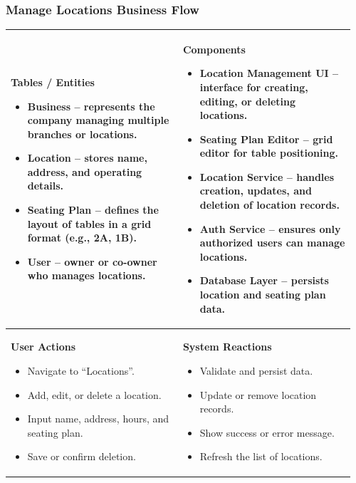 \documentclass[]{VUMIFTemplateClass}
\newenvironment{mpitemlist}[1][\linewidth]{%
    \begin{minipage}[t]{#1}%
        \setlength{\leftmargini}{12pt}%
        \begin{itemize}%
            \setlength{\itemsep}{1pt}%
            \setlength{\parskip}{0pt}%
            \setlength{\parsep}{0pt}%
}{%
        \end{itemize}%
    \end{minipage}\newline
}
\begin{document}
\subsubsection{Manage Locations Business Flow}
\begin{center}
\setlength{\tabcolsep}{8pt}
\renewcommand{\arraystretch}{1.3}
\begin{tabular}{|p{0.48\linewidth}|p{0.48\linewidth}|}
\hline
\textbf{Tables / Entities} \newline
\begin{mpitemlist}
\item \textbf{Business} – represents the company managing multiple branches or locations.
\item \textbf{Location} – stores name, address, and operating details.
\item \textbf{Seating Plan} – defines the layout of tables in a grid format (e.g., 2A, 1B).
\item \textbf{User} – owner or co-owner who manages locations.
\end{mpitemlist}
&
\textbf{Components} \newline
\begin{mpitemlist}
\item \textbf{Location Management UI} – interface for creating, editing, or deleting locations.
\item \textbf{Seating Plan Editor} – grid editor for table positioning.
\item \textbf{Location Service} – handles creation, updates, and deletion of location records.
\item \textbf{Auth Service} – ensures only authorized users can manage locations.
\item \textbf{Database Layer} – persists location and seating plan data.
\end{mpitemlist}
\\ \hline
\textbf{User Actions} \newline
\begin{mpitemlist}
\item Navigate to “Locations”.
\item Add, edit, or delete a location.
\item Input name, address, hours, and seating plan.
\item Save or confirm deletion.
\end{mpitemlist}
&
\textbf{System Reactions} \newline
\begin{mpitemlist}
\item Validate and persist data.
\item Update or remove location records.
\item Show success or error message.
\item Refresh the list of locations.
\end{mpitemlist}
\\ \hline
\end{tabular}
\end{center}
\end{document}
